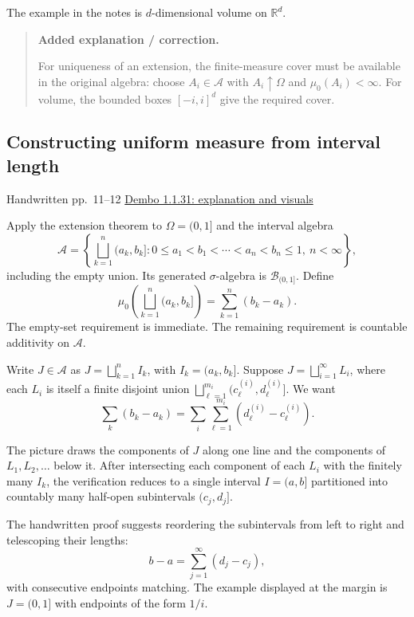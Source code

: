 \documentclass[11pt,letterpaper]{article}
\newcommand{\lecturesection}[1]{\subsection{#1}}
\begin{document}
The example in the notes is $d$-dimensional volume on $\mathbb R^d$.

\begin{quote}\small\textbf{Added explanation / correction.}

For uniqueness of an extension, the finite-measure cover must be available in the original algebra: choose $A_i\in\mathcal A$ with $A_i\uparrow\Omega$ and $\mu_0(A_i)<\infty$. For volume, the bounded boxes $[-i,i]^d$ give the required cover.
\end{quote}

\hypertarget{l2-s2}{}
\lecturesection{Constructing uniform measure from interval length}
{\small\textcolor{lectureink}{Handwritten pp.\ 11--12} \quad \href{https://josephrbailey.com/probability/\#entry-1-1-31}{Dembo 1.1.31: explanation and visuals}}

Apply the extension theorem to $\Omega=(0,1]$ and the interval algebra \[\mathcal A=\left\{\bigsqcup_{k=1}^{n}(a_k,b_k]:0\le a_1<b_1<\cdots<a_n<b_n\le1,\ n<\infty\right\},\] including the empty union. Its generated $\sigma$-algebra is $\mathcal B_{(0,1]}$. Define \[\mu_0\!\left(\bigsqcup_{k=1}^{n}(a_k,b_k]\right)=\sum_{k=1}^{n}(b_k-a_k).\] The empty-set requirement is immediate. The remaining requirement is countable additivity on $\mathcal A$.

Write $J\in\mathcal A$ as $J=\bigsqcup_{k=1}^{n}I_k$, with $I_k=(a_k,b_k]$. Suppose $J=\bigsqcup_{i=1}^{\infty}L_i$, where each $L_i$ is itself a finite disjoint union $\bigsqcup_{\ell=1}^{m_i}(c_\ell^{(i)},d_\ell^{(i)}]$. We want \[\sum_k(b_k-a_k)=\sum_i\sum_{\ell=1}^{m_i}(d_\ell^{(i)}-c_\ell^{(i)}).\]

The picture draws the components of $J$ along one line and the components of $L_1,L_2,\ldots$ below it. After intersecting each component of each $L_i$ with the finitely many $I_k$, the verification reduces to a single interval $I=(a,b]$ partitioned into countably many half-open subintervals $(c_j,d_j]$.

The handwritten proof suggests reordering the subintervals from left to right and telescoping their lengths: \[b-a=\sum_{j=1}^{\infty}(d_j-c_j),\] with consecutive endpoints matching. The example displayed at the margin is $J=(0,1]$ with endpoints of the form $1/i$.
\end{document}
